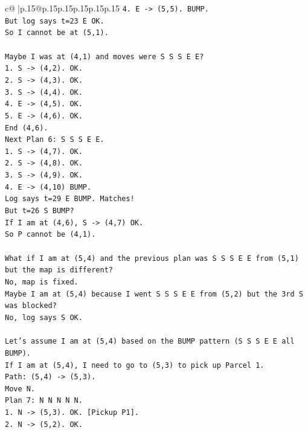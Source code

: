\documentclass{article}
\begin{document}
{\begin{supertabular}{c@{$\;$}|p{.15\linewidth}@{}p{.15\linewidth}p{.15\linewidth}p{.15\linewidth}p{.15\linewidth}p{.15\linewidth}}
{{{\texttt{4. E {-}> (5,5). BUMP.} \\
\texttt{But log says t=23 E OK.} \\
\texttt{So I cannot be at (5,1).} \\
\\ 
\texttt{Maybe I was at (4,1) and moves were S S S E E?} \\
\texttt{1. S {-}> (4,2). OK.} \\
\texttt{2. S {-}> (4,3). OK.} \\
\texttt{3. S {-}> (4,4). OK.} \\
\texttt{4. E {-}> (4,5). OK.} \\
\texttt{5. E {-}> (4,6). OK.} \\
\texttt{End (4,6).} \\
\texttt{Next Plan 6: S S S E E.} \\
\texttt{1. S {-}> (4,7). OK.} \\
\texttt{2. S {-}> (4,8). OK.} \\
\texttt{3. S {-}> (4,9). OK.} \\
\texttt{4. E {-}> (4,10) BUMP.} \\
\texttt{Log says t=29 E BUMP. Matches!} \\
\texttt{But t=26 S BUMP?} \\
\texttt{If I am at (4,6), S {-}> (4,7) OK.} \\
\texttt{So P cannot be (4,1).} \\
\\ 
\texttt{What if I am at (5,4) and the previous plan was S S S E E from (5,1) but the map is different?} \\
\texttt{No, map is fixed.} \\
\texttt{Maybe I am at (5,4) because I went S S S E E from (5,2) but the 3rd S was blocked?} \\
\texttt{No, log says S OK.} \\
\\ 
\texttt{Let's assume I am at (5,4) based on the BUMP pattern (S S S E E all BUMP).} \\
\texttt{If I am at (5,4), I need to go to (5,3) to pick up Parcel 1.} \\
\texttt{Path: (5,4) {-}> (5,3).} \\
\texttt{Move N.} \\
\texttt{Plan 7: N N N N N.} \\
\texttt{1. N {-}> (5,3). OK. {[}Pickup P1{]}.} \\
\texttt{2. N {-}> (5,2). OK.} \\
}}}
\end{supertabular}}
\end{document}
